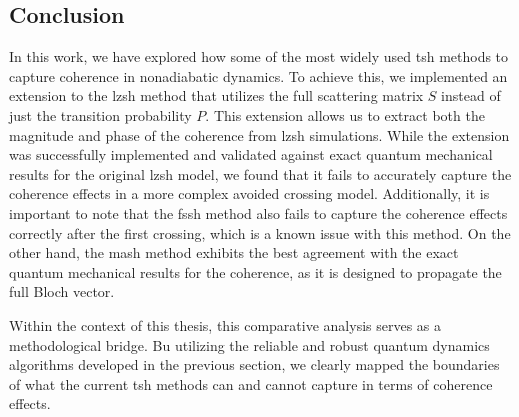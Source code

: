 \subsection{Conclusion}
In this work, we have explored how some of the most widely used \acrshort{tsh} methods to capture coherence in nonadiabatic dynamics. To achieve this, we implemented an extension to the \acrshort{lzsh} method that utilizes the full scattering matrix $S$ instead of just the transition probability $P$. This extension allows us to extract both the magnitude and phase of the coherence from \acrshort{lzsh} simulations. While the extension was successfully implemented and validated against exact quantum mechanical results for the original \acrshort{lzsh} model, we found that it fails to accurately capture the coherence effects in a more complex avoided crossing model. Additionally, it is important to note that the \acrshort{fssh} method also fails to capture the coherence effects correctly after the first crossing, which is a known issue with this method. On the other hand, the \acrshort{mash} method exhibits the best agreement with the exact quantum mechanical results for the coherence, as it is designed to propagate the full Bloch vector.

Within the context of this thesis, this comparative analysis serves as a methodological bridge. Bu utilizing the reliable and robust quantum dynamics algorithms developed in the previous section, we clearly mapped the boundaries of what the current \acrshort{tsh} methods can and cannot capture in terms of coherence effects.

